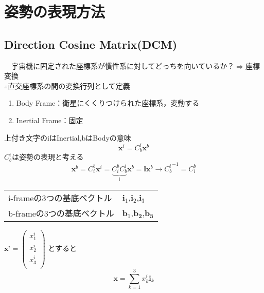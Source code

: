 \documentclass[class=article, crop=false, dvipdfmx, fleqn]{standalone}
\begin{document}
\section{姿勢の表現方法}

\subsection{Direction Cosine Matrix(DCM)}
　宇宙機に固定された座標系が慣性系に対してどっちを向いているか？$\Rightarrow$座標変換 \\
 $\therefore$直交座標系の間の変換行列として定義
\begin{enumerate}[label = \maru{\theenumi}]
\item Body Frame：衛星にくくりつけられた座標系，変動する 
\item Inertial Frame：固定
\end{enumerate}
上付き文字のiはInertial,bはBodyの意味
\[ \bm{x}^i=C^i_b\bm{x}^b \]
$C^i_b$は姿勢の表現と考える
\[ \bm{x}^b = C^b_i \bm{x}^i = \underbrace{C^b_i C^i_b}_{\mathbb{I}} \bm{x}^b = \mathbb{I} \bm{x}^b
 	\rightarrow {C^i_b}^{-1} = C^b_i \]

\begin{tabular}{ll}
i-frameの3つの基底ベクトル & $\bm{i}_1$,$\bm{i}_2$,$\bm{i}_3$ \\
b-frameの3つの基底ベクトル & $\bm{b}_1$,$\bm{b_2}$,$\bm{b_3}$
\end{tabular}

$\bm{x}^i=
 	\begin{pmatrix}
    	x^i_1\\
        x^i_2\\
        x^i_3\\
    \end{pmatrix}$
とすると
\begin{equation}
\bm{x} = \sum_{k=1}^{3} x^i_k \bm{i}_k \label{eq:1}
\end{equation}
\end{document}

